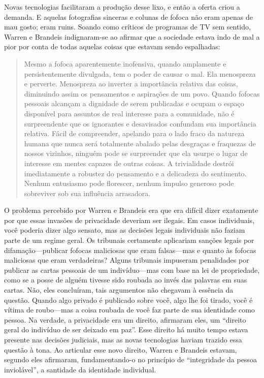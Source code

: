 \documentclass{book}
\begin{document}
Novas tecnologias facilitaram a produção desse lixo, e então a oferta criou
a demanda. E aquelas fotografias sinceras e colunas de fofoca não eram apenas
de mau gosto; eram ruins. Soando como críticos de programas de TV
sem sentido, Warren e Brandeis indignaram-se ao afirmar que a sociedade 
estava indo de mal a pior por conta de todas aquelas coisas que estavam
sendo espalhadas:

\begin{quote}
Mesmo a fofoca aparentemente inofensiva, quando amplamente e persistentemente
divulgada, tem o poder de causar o mal. Ela menospreza e perverte. Menospreza
ao inverter a importância relativa das coisas, diminuindo assim os pensamentos
e aspirações de um povo. Quando fofocas pessoais alcançam a dignidade de serem
publicadas e ocupam o espaço disponível para assuntos de real interesse para a
comunidade, não é surpreendente que os ignorantes e desavisados confundam sua
importância relativa. Fácil de compreender, apelando para o lado fraco da
natureza humana que nunca será totalmente abalado pelas desgraças e fraquezas de
nossos vizinhos, ninguém pode se surpreender que ela usurpe o lugar de interesse
em mentes capazes de outras coisas. A trivialidade destrói imediatamente a
robustez do pensamento e a delicadeza do sentimento. Nenhum entusiasmo pode
florescer, nenhum impulso generoso pode sobreviver sob sua influência arrasadora.
\end{quote}

O problema percebido por Warren e Brandeis era que era difícil dizer exatamente
por que essas invasões de privacidade deveriam ser ilegais. Em casos individuais,
você poderia dizer algo sensato, mas as decisões legais individuais não faziam
parte de um regime geral. Os tribunais certamente aplicariam sanções legais
por difamação---publicar fofocas maliciosas que eram falsas---mas e quanto às
fofocas maliciosas que eram verdadeiras? Alguns tribunais impuseram
penalidades por publicar as cartas pessoais de um indivíduo---mas com base
na lei de propriedade, como se a posse de alguém tivesse sido roubada ao invés
das palavras em suas cartas.
Não, eles concluíram, tais argumentos não chegavam à essência da questão. Quando
algo privado é publicado sobre você, algo lhe foi tirado, você é vítima de 
roubo---mas a coisa roubada de você faz parte de sua identidade como pessoa. Na
verdade, a privacidade era um direito, afirmaram eles, um ``direito geral do 
indivíduo de ser deixado em paz''. Esse direito há muito tempo estava presente nas 
decisões judiciais, mas as novas tecnologias haviam trazido essa questão à tona. Ao
articular esse novo direito, Warren e Brandeis estavam, segundo eles afirmaram,
fundamentando-o no princípio de ``integridade da pessoa inviolável'', a santidade
da identidade individual.
\end{document}
